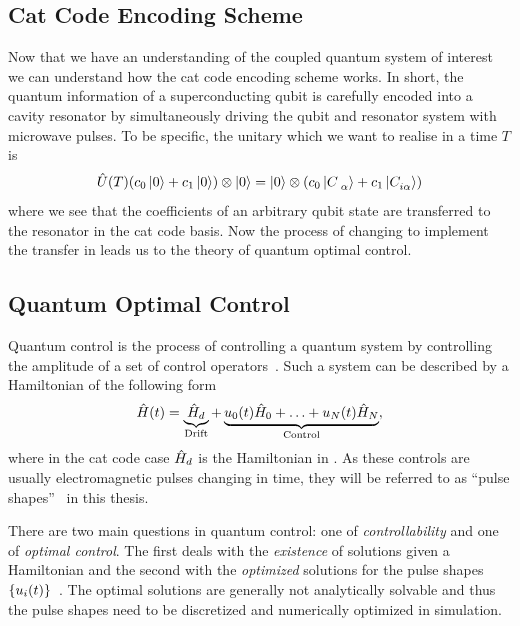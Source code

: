 \documentclass[main.tex]{subfiles}
\begin{document}
\subsection{Cat Code Encoding Scheme}
Now that we have an understanding of the coupled quantum system of interest we can understand how the cat code encoding scheme works.
In short, the quantum information of a superconducting qubit is carefully encoded into a cavity resonator by simultaneously driving the qubit and resonator system with microwave pulses.
To be specific, the unitary which we want to realise in a time \(T\) is
\begin{equation}
    \hat{U}(T) \qty(c_0\ket{0}+c_1\ket{0})\otimes\ket{0} = \ket{0}\otimes\qty(c_0\cat{}+c_1\cat[i]{})
    \label{eq:cat-code-unitary}
\end{equation}
where we see that the coefficients of an arbitrary qubit state are transferred to the resonator in the cat code basis.
Now the process of changing  to implement the transfer in  leads us to the theory of quantum optimal control.

\subsection{Quantum Optimal Control}
Quantum control is the process of controlling a quantum system by controlling the amplitude of a set of control operators~\cite{fisher_optimal_2010}.
Such a system can be described by a Hamiltonian of the following form~\cite{fisher_optimal_2010}
\begin{equation}
    \hat{H}(t) = \underbrace{\hat{H}_d}_{\text{Drift}} + \underbrace{u_0(t)\hat{H}_0 + \dotsc + u_N(t)\hat{H}_N}_{\text{Control}},
    \label{eq:optimal-control-hamiltonian}
\end{equation}
where in the cat code case \(\hat{H}_d\) is the Hamiltonian in .
As these controls are usually electromagnetic pulses changing in time, they will be referred to as ``pulse shapes''~\cite{fisher_optimal_2010} in this thesis.

There are two main questions in quantum control: one of \emph{controllability} and one of \emph{optimal control}.
The first deals with the \emph{existence} of solutions given a Hamiltonian and the second with the \emph{optimized} solutions for the pulse shapes \(\qty{u_i(t)}\)~\cite{dalessandro_introduction_2007}.
The optimal solutions are generally not analytically solvable and thus the pulse shapes need to be discretized and numerically optimized in simulation.
\end{document}
